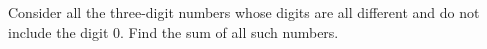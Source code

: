 Consider all the three-digit numbers whose digits are all different and do not include the digit $0$. Find the sum of all such numbers.

